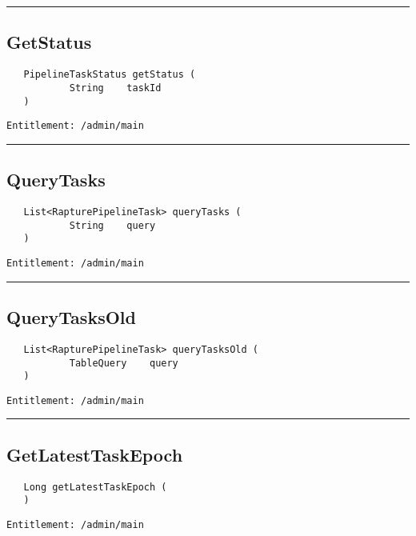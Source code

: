 \rule{12cm}{2pt}
\subsection{GetStatus}
\label{Api:GetStatus}
\begin{Verbatim}
   PipelineTaskStatus getStatus (
           String    taskId
   )
\end{Verbatim}
\begin{Verbatim}[formatcom=\color{Maroon}]
  Entitlement: /admin/main
\end{Verbatim}



\rule{12cm}{2pt}
\subsection{QueryTasks}
\label{Api:QueryTasks}
\begin{Verbatim}
   List<RapturePipelineTask> queryTasks (
           String    query
   )
\end{Verbatim}
\begin{Verbatim}[formatcom=\color{Maroon}]
  Entitlement: /admin/main
\end{Verbatim}



\rule{12cm}{2pt}
\subsection{QueryTasksOld}
\label{Api:QueryTasksOld}
\begin{Verbatim}
   List<RapturePipelineTask> queryTasksOld (
           TableQuery    query
   )
\end{Verbatim}
\begin{Verbatim}[formatcom=\color{Maroon}]
  Entitlement: /admin/main
\end{Verbatim}



\rule{12cm}{2pt}
\subsection{GetLatestTaskEpoch}
\label{Api:GetLatestTaskEpoch}
\begin{Verbatim}
   Long getLatestTaskEpoch (
   )
\end{Verbatim}
\begin{Verbatim}[formatcom=\color{Maroon}]
  Entitlement: /admin/main
\end{Verbatim}



